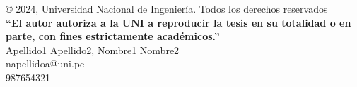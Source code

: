 \begin{permisos}

	\onehalfspacing  %
	
	© 2024, Universidad Nacional de Ingeniería. Todos los derechos reservados \\
	\textbf{``El autor autoriza a la UNI a reproducir la tesis en su totalidad o en parte, con fines estrictamente académicos.''} \\
	Apellido1 Apellido2, Nombre1 Nombre2 \\
	napellidoa@uni.pe \\
	987654321  
	
	\singlespacing  %
	
\end{permisos}
